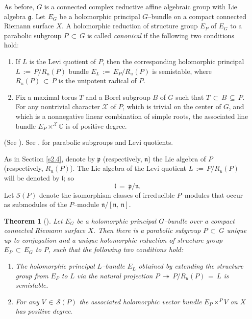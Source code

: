 \documentclass[12pt, reqno]{amsart}
\numberwithin{equation}{section}
\newtheorem{theorem}{Theorem}[section]
\begin{document}
As before, $G$ is a connected complex reductive affine algebraic group with Lie algebra $\mathfrak{g}$. Let 
$E_{G}$ be a holomorphic principal $G$--bundle on a compact connected Riemann surface $X$. A holomorphic 
reduction of structure group $E_{P}$ of $E_{G}$ to a parabolic subgroup $P\, \subset\, G$ is called {\it 
canonical} if the following two conditions hold:
\begin{enumerate}
\item If $L$ is the Levi quotient of $P$, then the corresponding holomorphic principal $L\,:=\,
P/R_u(P)$ bundle $E_{L}\,:=\,
E_{P}/R_u(P)$ is semistable, where $R_u(P)\, \subset\, P$ is the unipotent radical of $P$.

\item Fix a maximal torus $T$ and a Borel subgroup $B$ of $G$ such that $T\, \subset\, B\,\subseteq\, P$.
For any nontrivial character $\mathcal{X}$ of $P$, which is trivial on the center of $G$,
and which is a nonnegative linear combination of simple roots, the associated line bundle
$E_{P}\times^{\mathcal{X}}\mathbb{C}$ is of positive degree.
\end{enumerate}
(See \cite{Ra2}). See \cite[Ch. 13, \S~4]{Sp}, \cite[Ch. IV, \S~11]{Bo} for parabolic subgroups and
Levi quotients.

As in Section \ref{s2.4}, denote by $\mathfrak p$ (respectively, $\mathfrak{n}$)
the Lie algebra of $P$ (respectively, $R_{u}(P)$). The Lie algebra of the Levi quotient
$L\,:=\, P/R_u(P)$ will be denoted by $\mathfrak l$; so
\begin{equation}\label{levi}
\mathfrak{l}\ =\ \mathfrak{p}/\mathfrak{n}.
\end{equation}
Let $\mathcal{S}(P)$ denote the isomorphism classes of irreducible $P$--modules that occur as submodules
of the $P$--module $\mathfrak{n}/[\mathfrak{n},\,\mathfrak{n}]$.

\begin{theorem}[{\cite[Theorem 1]{AAB}}]\label{1.2}
Let $E_{G}$ be a holomorphic principal $G$--bundle over a compact connected Riemann surface $X$.
Then there is a parabolic subgroup $P\, \subset\, G$ unique up to conjugation and
a unique holomorphic reduction of structure group $E_P\, \subset\, E_{G}$ to $P$, such that the following
two conditions hold:
\begin{enumerate}
\item The holomorphic principal $L$--bundle $E_{L}$ obtained by extending the structure group from $E_{P}$
to $L$ via the natural projection $P\,\twoheadrightarrow\, P/R_{u}(P)\,=\,L$ is semistable.

\item For any $V\,\in\, \mathcal{S}(P)$ the associated holomorphic vector bundle $E_{P}\times^{P}V$ on $X$
has positive degree.
\end{enumerate}
\end{theorem}
\end{document}
